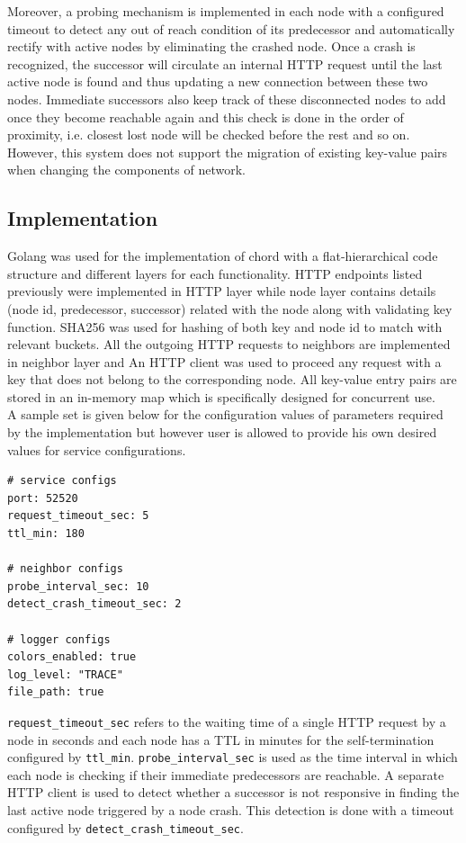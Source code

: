 \documentclass[
    a4paper,
    twocolumn,
]{article}
\begin{document}
Moreover, a probing mechanism is implemented in each node with a configured timeout to detect any out of reach condition of its predecessor and automatically rectify with active nodes by eliminating the crashed node. Once a crash is recognized, the successor will circulate an internal HTTP request until the last active node is found and thus updating a new connection between these two nodes. Immediate successors also keep track of these disconnected nodes to add once they become reachable again and this check is done in the order of proximity, i.e. closest lost node will be checked before the rest and so on. However, this system does not support the migration of existing key-value pairs when changing the components of network.

\subsection{Implementation}

Golang was used for the implementation of chord with a flat-hierarchical code structure and different layers for each functionality. HTTP endpoints listed previously were implemented in HTTP layer while node layer contains details (node id, predecessor, successor) related with the node along with validating key function. SHA256 was used for hashing of both key and node id to match with relevant buckets. All the outgoing HTTP requests to neighbors are implemented in neighbor layer and An HTTP client was used to proceed any request with a key that does not belong to the corresponding node. All key-value entry pairs are stored in an in-memory map which is specifically designed for concurrent use.\\

A sample set is given below for the configuration values of parameters required by the implementation but however user is allowed to provide his own desired values for service configurations. 

\begin{verbatim}
# service configs
port: 52520
request_timeout_sec: 5
ttl_min: 180

# neighbor configs
probe_interval_sec: 10
detect_crash_timeout_sec: 2

# logger configs
colors_enabled: true
log_level: "TRACE"
file_path: true
\end{verbatim}

\texttt{request\_timeout\_sec} refers to the waiting time of a single HTTP request by a node in seconds and each node has a TTL in minutes for the self-termination configured by \texttt{ttl\_min}. \texttt{probe\_interval\_sec} is used as the time interval in which each node is checking if their immediate predecessors are reachable. A separate HTTP client is used to detect whether a successor is not responsive in finding the last active node triggered by a node crash. This detection is done with a timeout configured by \texttt{detect\_crash\_timeout\_sec}. \\
\end{document}
